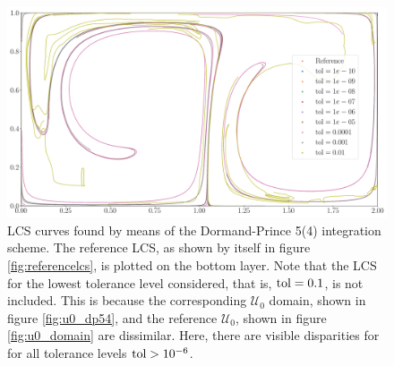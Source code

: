 \begin{figure}[htpb]
    \centering
    \includegraphics[width=0.9\linewidth]{figures/lcs_figures/rkdp54.pdf}
    \caption[LCS curves found by means of the Dormand-Prince 5(4) integration
    scheme]{
        LCS curves found by means of the Dormand-Prince 5(4) integration
        scheme. The reference LCS, as shown by itself in figure
        \ref{fig:referencelcs}, is plotted on the bottom layer. Note that
        the LCS for the lowest tolerance level considered, that is,
        $\textnormal{tol}=0.1$, is not included. This is because the
        corresponding $\mathcal{U}_{0}$ domain, shown in figure
        \ref{fig:u0_dp54}, and the reference $\mathcal{U}_{0}$, shown in figure
        \ref{fig:u0_domain} are dissimilar. Here, there are visible
        disparities for for all tolerance levels $\textnormal{tol}>10^{-6}$.}
    \label{fig:lcs_rkdp54}
\end{figure}
